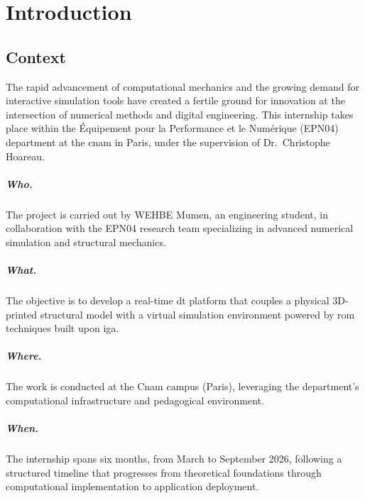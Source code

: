 \chapter*{Introduction}

\section*{Context}

The rapid advancement of computational mechanics and the growing demand for interactive simulation tools have created a fertile ground for innovation at the intersection of numerical methods and digital engineering. This internship takes place within the Équipement pour la Performance et le Numérique (EPN04) department at the \acrlong{cnam} in Paris, under the supervision of Dr.\ Christophe Hoareau.

\paragraph{Who.} The project is carried out by WEHBE Mumen, an engineering student, in collaboration with the EPN04 research team specializing in advanced numerical simulation and structural mechanics.

\paragraph{What.} The objective is to develop a real-time \acrfull{dt} platform that couples a physical 3D-printed structural model with a virtual simulation environment powered by \acrfull{rom} techniques built upon \acrfull{iga}.

\paragraph{Where.} The work is conducted at the Cnam campus (Paris), leveraging the department's computational infrastructure and pedagogical environment.

\paragraph{When.} The internship spans six months, from March to September 2026, following a structured timeline that progresses from theoretical foundations through computational implementation to application deployment.

